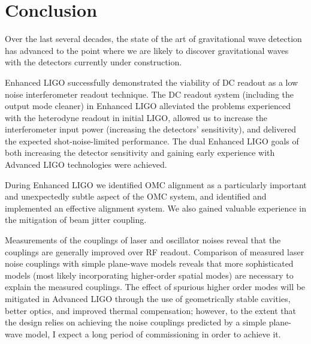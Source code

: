 \chapter{Conclusion}
\label{conclusion}

Over the last several decades, the state of the art of gravitational
wave detection has advanced to the point where we are likely to
discover gravitational waves with the detectors currently under
construction.

Enhanced LIGO successfully demonstrated the viability of DC readout as
a low noise interferometer readout technique.  The DC readout system
(including the output mode cleaner) in Enhanced LIGO alleviated the
problems experienced with the heterodyne readout in initial LIGO,
allowed us to increase the interferometer input power (increasing the
detectors' sensitivity), and delivered the expected shot-noise-limited
performance.  The dual Enhanced LIGO goals of both increasing the
detector sensitivity and gaining early experience with Advanced LIGO
technologies were achieved.

During Enhanced LIGO we identified OMC alignment as a particularly
important and unexpectedly subtle aspect of the OMC system, and
identified and implemented an effective alignment system.  We also
gained valuable experience in the mitigation of beam jitter coupling.

Measurements of the couplings of laser and oscillator noises reveal
that the couplings are generally improved over RF readout.  Comparison
of measured laser noise couplings with simple plane-wave models
reveals that more sophisticated models (most likely incorporating
higher-order spatial modes) are necessary to explain the measured
couplings.  The effect of spurious higher order modes will be
mitigated in Advanced LIGO through the use of geometrically stable
cavities, better optics, and improved thermal compensation; however,
to the extent that the design relies on achieving the noise couplings
predicted by a simple plane-wave model, I expect a long period of
commissioning in order to achieve it.  



